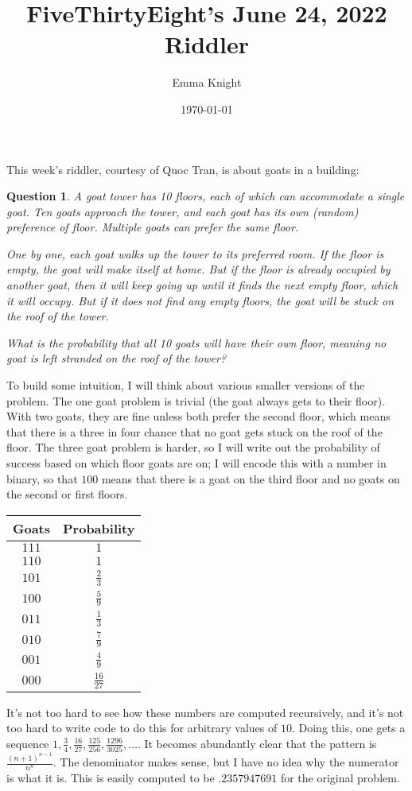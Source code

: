 \documentclass[11pt]{article}
\title{FiveThirtyEight's June 24, 2022 Riddler}
\author{Emma Knight}
\date{\today}
\newtheorem{question}[theorem]{Question}
\theoremstyle{definition}
\begin{document}
\maketitle
This week's riddler, courtesy of Quoc Tran, is about goats in a building:
\begin{question}
A goat tower has 10 floors, each of which can accommodate a single goat. Ten goats approach the tower, and each goat has its own (random) preference of floor. Multiple goats can prefer the same floor.

One by one, each goat walks up the tower to its preferred room. If the floor is empty, the goat will make itself at home. But if the floor is already occupied by another goat, then it will keep going up until it finds the next empty floor, which it will occupy. But if it does not find any empty floors, the goat will be stuck on the roof of the tower.

What is the probability that all 10 goats will have their own floor, meaning no goat is left stranded on the roof of the tower?
\end{question}
To build some intuition, I will think about various smaller versions of the problem.  The one goat problem is trivial (the goat always gets to their floor).  With two goats, they are fine unless both prefer the second floor, which means that there is a three in four chance that no goat gets stuck on the roof of the floor.  The three goat problem is harder, so I will write out the probability of success based on which floor goats are on; I will encode this with a number in binary, so that $100$ means that there is a goat on the third floor and no goats on the second or first floors.

\begin{tabular}{c|c}
Goats & Probability \\ \hline \hline
$111$ & $1$ \\ \hline
$110$ & $1$ \\ \hline
$101$ & $\frac{2}{3}$ \\ \hline
$100$ & $\frac{5}{9}$ \\ \hline
$011$ & $\frac{1}{3}$ \\ \hline
$010$ & $\frac{7}{9}$ \\ \hline
$001$ & $\frac{4}{9}$ \\ \hline
$000$ & $\frac{16}{27}$
\end{tabular}

It's not too hard to see how these numbers are computed recursively, and it's not too hard to write code to do this for arbitrary values of $10$.  Doing this, one gets a sequence $1, \frac{3}{4}, \frac{16}{27}, \frac{125}{256}, \frac{1296}{3025}, \ldots$.  It becomes abundantly clear that the pattern is $\frac{(n+1)^{n-1}}{n^n}$.  The denominator makes sense, but I have no idea why the numerator is what it is.  This is easily computed to be $.2357947691$ for the original problem.
\end{document}
